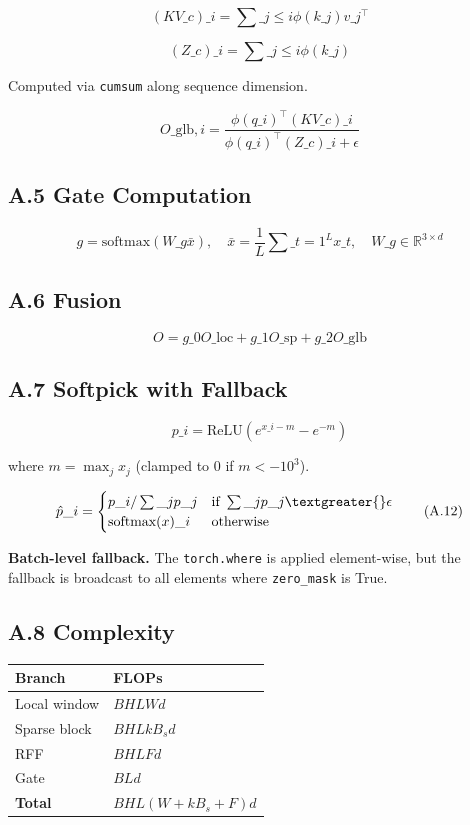 \[
(KV\_c)\_i = \sum\_{j \leq i} \phi(k\_j) v\_j^\top
\tag{A.6}
\]

\[
(Z\_c)\_i = \sum\_{j \leq i} \phi(k\_j)
\tag{A.7}
\]

Computed via \texttt{cumsum} along sequence dimension.

\[
O\_{\text{glb}, i} = \frac{\phi(q\_i)^\top (KV\_c)\_i}{\phi(q\_i)^\top (Z\_c)\_i + \epsilon}
\tag{A.8}
\]

\subsection{A.5 Gate Computation}

\[
g = \text{softmax}(W\_g \bar{x}), \quad
\bar{x} = \frac{1}{L} \sum\_{t=1}^{L} x\_t, \quad
W\_g \in \mathbb{R}^{3 \times d}
\tag{A.9}
\]

\subsection{A.6 Fusion}

\[
O = g\_0 O\_{\text{loc}} + g\_1 O\_{\text{sp}} + g\_2 O\_{\text{glb}}
\tag{A.10}
\]

\subsection{A.7 Softpick with Fallback}

\[
p\_i = \text{ReLU}(e^{x\_i - m} - e^{-m})
\tag{A.11}
\]

where $m = \max_j x_j$ (clamped to $0$ if $m < -10^3$).

\[
\hat{p}\_i = \begin{cases} p\_i / \sum\_j p\_j & \text{if } \sum\_j p\_j \textgreater{} \epsilon \\ \text{softmax}(x)\_i & \text{otherwise} \end{cases}
\tag{A.12}
\]

\textbf{Batch-level fallback.} The \texttt{torch.where} is applied element-wise, but 
the fallback is broadcast to all elements where \texttt{zero\_mask} is True.

\subsection{A.8 Complexity}

\begin{table}[H]
\centering
\small
\begin{tabular}{ll}
\toprule
\textbf{Branch} & \textbf{FLOPs} \\
\midrule
Local window & $B H L W d$ \\
Sparse block & $B H L k B_s d$ \\
RFF & $B H L F d$ \\
Gate & $B L d$ \\
\textbf{Total} & $B H L (W + k B_s + F) d$ \\
\bottomrule
\end{tabular}
\end{table}

